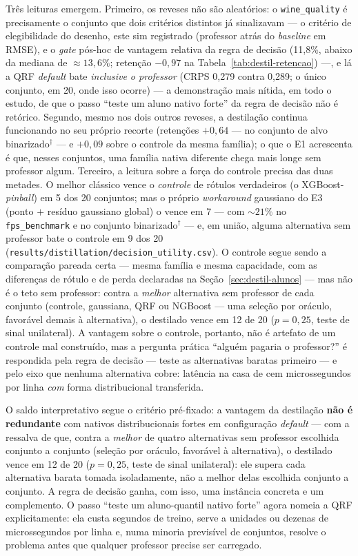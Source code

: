 Três leituras emergem. Primeiro, os reveses não são aleatórios: o
\texttt{wine\_quality} é precisamente o conjunto que dois critérios
distintos já sinalizavam --- o critério de elegibilidade do desenho,
este sim registrado (professor atrás do \emph{baseline}
em RMSE), e o \emph{gate} pós-hoc de vantagem relativa da regra de
decisão (11,8\%, abaixo da mediana de ${\approx}13{,}6\%$; retenção
$-0{,}97$ na Tabela~\ref{tab:destil-retencao}) ---, e lá
a QRF \emph{default} bate \emph{inclusive o professor} (CRPS 0,279 contra
0,289; o único conjunto, em 20, onde isso ocorre) --- a demonstração
mais nítida, em todo o estudo, de que o
passo ``teste um aluno nativo forte'' da regra de decisão não é
retórico. Segundo, mesmo nos dois outros reveses, a destilação
continua funcionando no seu próprio recorte (retenções $+0{,}64$ ---
no conjunto de alvo binarizado$^\dagger$ --- e
$+0{,}09$ sobre o controle da mesma família); o que o E1 acrescenta é
que, nesses conjuntos, uma família nativa diferente chega mais longe
sem professor algum. Terceiro, a leitura sobre a força do controle
precisa das duas metades. O melhor clássico vence o \emph{controle} de
rótulos verdadeiros (o XGBoost-\emph{pinball}) em 5 dos 20 conjuntos;
mas o próprio \emph{workaround} gaussiano do E3 (ponto $+$ resíduo
gaussiano global) o vence em 7 --- com ${\sim}21\%$ no
\texttt{fps\_\allowbreak benchmark} e no conjunto
binarizado$^\dagger$ --- e, em união, alguma alternativa sem professor bate o controle em
9 dos 20
(\texttt{results/\allowbreak distillation/\allowbreak decision\_\allowbreak utility.csv}).
O controle segue sendo a comparação pareada certa --- mesma família e
mesma capacidade, com as diferenças de rótulo e de perda declaradas na
Seção~\ref{sec:destil-alunos} --- mas não é o
teto sem professor: contra a \emph{melhor} alternativa sem professor
de cada conjunto (controle, gaussiana, QRF ou NGBoost --- uma seleção
por oráculo, favorável demais à alternativa), o destilado vence em 12
de 20 ($p=0{,}25$, teste de sinal unilateral). A vantagem sobre o
controle, portanto, não é
artefato de um controle mal construído, mas a pergunta prática
``alguém pagaria o professor?'' é respondida pela regra de decisão
--- teste as alternativas baratas primeiro --- e pelo eixo que nenhuma
alternativa cobre: latência na casa de cem microssegundos por linha
\emph{com} forma distribucional transferida.

O saldo interpretativo segue o critério pré-fixado: a vantagem da
destilação \textbf{não é redundante} com nativos distribucionais
fortes em configuração \emph{default} --- com a ressalva de que,
contra a \emph{melhor} de quatro
alternativas sem professor escolhida conjunto a conjunto (seleção por
oráculo, favorável à alternativa), o destilado vence em 12 de 20
($p=0{,}25$, teste de sinal unilateral): ele supera cada alternativa
barata tomada isoladamente,
não a melhor delas escolhida conjunto a conjunto. A regra de decisão ganha, com isso, uma
instância concreta e um complemento. O passo ``teste um aluno-quantil
nativo forte'' agora nomeia a QRF explicitamente: ela custa segundos
de treino, serve a unidades ou dezenas de microssegundos por linha
e, numa minoria previsível de
conjuntos, resolve o problema antes que qualquer professor precise ser
carregado.

